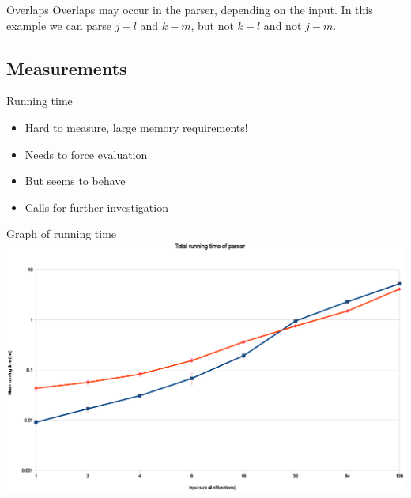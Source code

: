 \documentclass{beamer}
\newcommand{\subt}[3] { 
  \draw[grid] (#1,#1) -- (#1,#2) node[inChart] {#3} -- (#2,#2);
  \fill[color=black] (#1,#2) circle (2pt)
 }
\newcommand{\mrk}[2]{\node[inChart] at (#1,#1) {#2}}
\begin{document}
\begin{frame}{Overlaps}
    Overlaps may occur in the parser, depending on the input. In this example we
    can parse $j-l$ and $k-m$, but not $k-l$ and not $j-m$.

\end{frame}

\subsection{Measurements}
\begin{frame}{Running time}
    \begin{itemize}
        \item Hard to measure, large memory requirements!
        \item Needs to force evaluation
        \item But seems to behave
        \pause
        \item Calls for further investigation
    \end{itemize}
\end{frame}

\begin{frame}{Graph of running time}
    \includegraphics[width=\textwidth]{runningtime.eps}
\end{frame}
\end{document}
